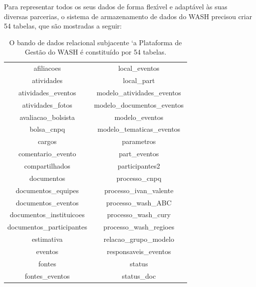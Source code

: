 \documentclass[
12pt,		%
openright,	%
twoside,  %
a4paper,			%
chapter=TITLE,		%
english,			%
french,				%
spanish,			%
brazil				%
]{USPSC-classe/USPSC}
\begin{document}
Para representar todos os seus dados de forma flex\'{\i}vel e adapt\'avel \`as suas diversas parcerias, o sistema de armazenamento de dados do WASH precisou criar 54 tabelas, que s\~ao mostradas a seguir:














\begin{table}[htb]
\tiny
\caption{\label{5b2e4ba8f3836249e7dd88b37344da7bfa3669c5}O bando de dados relacional subjacente `a Plataforma de Gest\~ao do WASH \'e constitu\'{i}do por 54 tabelas.}

\centering
\begin{tabular}{|c|c|}
\hline
afiliacoes                     &   local\_eventos \\
 atividades                     &   local\_part \\
 atividades\_eventos             &   modelo\_atividades\_eventos \\
 atividades\_fotos               &   modelo\_documentos\_eventos \\
 avaliacao\_bolsista             &   modelo\_eventos \\
 bolsa\_cnpq                     &   modelo\_tematicas\_eventos \\
 cargos                         &   parametros \\
 comentario\_evento              &   part\_eventos \\
 compartilhados                 &   participantes2 \\
 documentos                     &   processo\_cnpq \\
 documentos\_equipes             &   processo\_ivan\_valente \\
 documentos\_eventos             &   processo\_wash\_ABC \\
 documentos\_instituicoes        &   processo\_wash\_cury \\
 documentos\_participantes       &   processo\_wash\_regioes \\
 estimativa                     &   relacao\_grupo\_modelo \\
 eventos                        &   responsaveis\_eventos \\
 fontes                         &   status \\
 fontes\_eventos                 &   status\_doc \\

\end{tabular}
\end{table}
\end{document}
